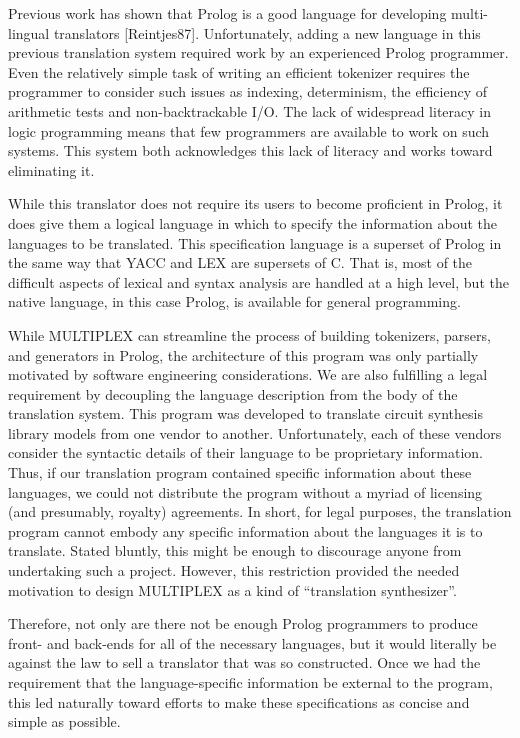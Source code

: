 Previous work has shown that Prolog is a good language
for developing multi-lingual translators [Reintjes87].
Unfortunately, adding a new language in this previous
translation system required work by an experienced Prolog
programmer.  Even the relatively simple task of writing an
efficient tokenizer requires the programmer to consider
such issues as indexing, determinism, the efficiency of
arithmetic tests and non-backtrackable I/O.
The lack of widespread literacy in logic programming
means that few programmers are available to work
on such systems. This system both acknowledges this
lack of literacy and works toward eliminating it.

While this translator does not require its
users to become proficient in Prolog, it
does give them a logical language
in which to specify the information about the
languages to be translated.  This specification
language is a superset of Prolog in the
same way that YACC and LEX are supersets of C.
That is, most of the difficult aspects of lexical
and syntax analysis are handled at a high level, 
but the native language, in this case Prolog,
is available for general programming.

While MULTIPLEX can streamline the process of building
tokenizers, parsers, and generators in Prolog, the
architecture of this program was only partially
motivated by software engineering considerations.
We are also fulfilling a legal requirement by
decoupling the language description from the body
of the translation system. This program was developed
to translate circuit synthesis library models from
one vendor to another.  Unfortunately, each of these
vendors consider the syntactic details of their
language to be proprietary information.
Thus, if our translation program contained
specific information about these languages,
we could not distribute the program without
a myriad of licensing (and presumably, royalty) agreements.
In short, for legal purposes, the translation program
cannot embody any specific information about the languages
it is to translate.  Stated bluntly, this might
be enough to discourage anyone from undertaking such a project.
However, this restriction provided the needed
motivation to design MULTIPLEX as a kind of
``translation synthesizer''.

Therefore, not only are there not be enough Prolog programmers
to produce front- and back-ends for all of the necessary
languages, but it would literally be against the law to
sell a translator that was so constructed.  Once we had the
requirement that the language-specific information
be external to the program, this led naturally
toward efforts to make these specifications as concise
and simple as possible.

